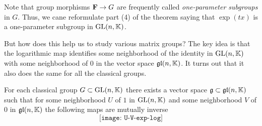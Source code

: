 Note that group morphisms $\mathbf{F}\to G$ are frequently called
\emph{one-parameter subgroups} in $G$. Thus, we cane reformulate part (4)
of the theorem saying that $\exp(tx)$ is a one-parameter subgroup in
$\mathrm{GL}(n,\mathbb{K})$.

But how does this help us to study various matrix groups? The key idea is
that the logarithmic map identifies some neighborhood of the identity in
$\mathrm{GL}(n,\mathbb{K})$ with some neighborhood of $0$ in the vector space
$\mathfrak{gl}(n,\mathbb{K})$. It turns out that it also does the same for all the
classical groups.

\begin{theorem}
  For each classical group $G\subset\mathrm{GL}(n,\mathbb{K})$ there exists a vector
  space $\mathfrak{g}\subset\mathfrak{gl}(n,\mathbb{K})$ such that for some neighborhood $U$
  of $1$ in $\mathrm{GL}(n,\mathbb{K})$ and some neighborhood $V$ of $0$ in
  $\mathfrak{gl}(n,\mathbb{K})$ the following maps are mutually inverse
  \[
    \texttt{[image: U-V-exp-log]}
  \]
\end{theorem}


